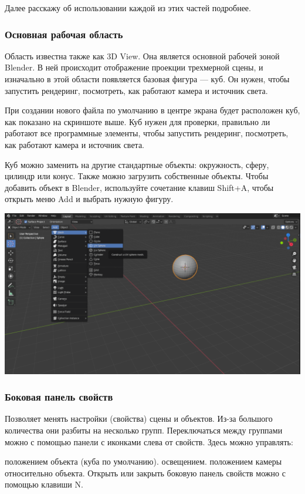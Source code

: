 \documentclass[12pt]{article}
\begin{document}
Далее расскажу об использовании каждой из этих частей подробнее.
\subsubsection{ Основная рабочая область }

Область известна также как 3D View. Она является основной рабочей зоной Blender. В ней происходит отображение проекции трехмерной сцены, и изначально в этой области появляется базовая фигура — куб. Он нужен, чтобы запустить рендеринг, посмотреть, как работают камера и источник света.

При создании нового файла по умолчанию в центре экрана будет расположен куб, как показано на скриншоте выше. Куб нужен для проверки, правильно ли работают все программные элементы, чтобы запустить рендеринг, посмотреть, как работают камера и источник света.

Куб можно заменить на другие стандартные объекты: окружность, сферу, цилиндр или конус. Также можно загрузить собственные объекты. Чтобы добавить объект в Blender, используйте сочетание клавиш Shift+A, чтобы открыть меню Add и выбрать нужную фигуру.

\vskip 1cm
{
    \centering
    \includegraphics[width=1\linewidth]{добавление_объекта.png}
    \label{fig:i1}
}
\vskip 1cm

\subsubsection{ Боковая панель свойств }

Позволяет менять настройки (свойства) сцены и объектов. Из-за большого количества они разбиты на несколько групп. Переключаться между группами можно с помощью панели с иконками слева от свойств. Здесь можно управлять:

положением объекта (куба по умолчанию).
освещением.
положением камеры относительно объекта.
Открыть или закрыть боковую панель свойств можно с помощью клавиши N.
\end{document}
